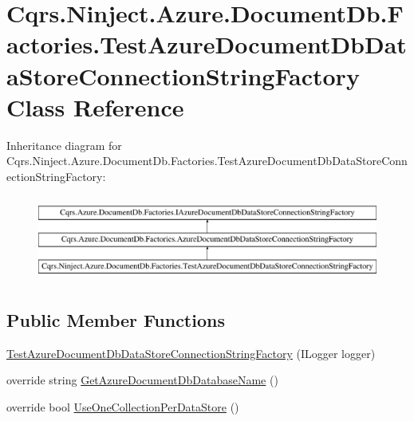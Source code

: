 \hypertarget{classCqrs_1_1Ninject_1_1Azure_1_1DocumentDb_1_1Factories_1_1TestAzureDocumentDbDataStoreConnectionStringFactory}{}\section{Cqrs.\+Ninject.\+Azure.\+Document\+Db.\+Factories.\+Test\+Azure\+Document\+Db\+Data\+Store\+Connection\+String\+Factory Class Reference}
\label{classCqrs_1_1Ninject_1_1Azure_1_1DocumentDb_1_1Factories_1_1TestAzureDocumentDbDataStoreConnectionStringFactory}
Inheritance diagram for Cqrs.\+Ninject.\+Azure.\+Document\+Db.\+Factories.\+Test\+Azure\+Document\+Db\+Data\+Store\+Connection\+String\+Factory\+:\begin{figure}[H]
\begin{center}
\leavevmode
\includegraphics[height=2.847458cm]{classCqrs_1_1Ninject_1_1Azure_1_1DocumentDb_1_1Factories_1_1TestAzureDocumentDbDataStoreConnectionStringFactory}
\end{center}
\end{figure}
\subsection*{Public Member Functions}
\begin{DoxyCompactItemize}
\item 
\hyperlink{classCqrs_1_1Ninject_1_1Azure_1_1DocumentDb_1_1Factories_1_1TestAzureDocumentDbDataStoreConnectionStringFactory_ad55763a7e19193cfecf2abca3759f2c6_ad55763a7e19193cfecf2abca3759f2c6}{Test\+Azure\+Document\+Db\+Data\+Store\+Connection\+String\+Factory} (I\+Logger logger)
\item 
override string \hyperlink{classCqrs_1_1Ninject_1_1Azure_1_1DocumentDb_1_1Factories_1_1TestAzureDocumentDbDataStoreConnectionStringFactory_ab4b864396b790819609d3337dfb3f75d_ab4b864396b790819609d3337dfb3f75d}{Get\+Azure\+Document\+Db\+Database\+Name} ()
\item 
override bool \hyperlink{classCqrs_1_1Ninject_1_1Azure_1_1DocumentDb_1_1Factories_1_1TestAzureDocumentDbDataStoreConnectionStringFactory_a3f802b2e647584bb96fdcdb532a149bb_a3f802b2e647584bb96fdcdb532a149bb}{Use\+One\+Collection\+Per\+Data\+Store} ()
\end{DoxyCompactItemize}
